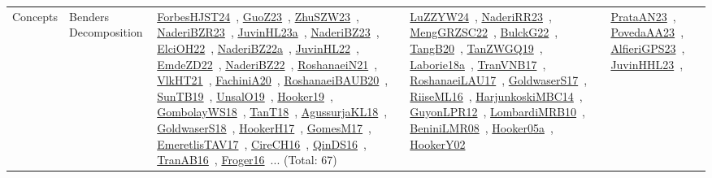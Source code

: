 {\begin{longtable}{lp{3cm}>{\raggedright\arraybackslash}p{6cm}>{\raggedright\arraybackslash}p{6cm}>{\raggedright\arraybackslash}p{8cm}}
\index{Benders Decomposition}\index{Concepts!Benders Decomposition}Concepts & Benders Decomposition & \href{../works/ForbesHJST24.pdf}{ForbesHJST24}~\cite{ForbesHJST24}, \href{../works/GuoZ23.pdf}{GuoZ23}~\cite{GuoZ23}, \href{../works/ZhuSZW23.pdf}{ZhuSZW23}~\cite{ZhuSZW23}, \href{../works/NaderiBZR23.pdf}{NaderiBZR23}~\cite{NaderiBZR23}, \href{../works/JuvinHL23a.pdf}{JuvinHL23a}~\cite{JuvinHL23a}, \href{../works/NaderiBZ23.pdf}{NaderiBZ23}~\cite{NaderiBZ23}, \href{../works/ElciOH22.pdf}{ElciOH22}~\cite{ElciOH22}, \href{../works/NaderiBZ22a.pdf}{NaderiBZ22a}~\cite{NaderiBZ22a}, \href{../works/JuvinHL22.pdf}{JuvinHL22}~\cite{JuvinHL22}, \href{../works/EmdeZD22.pdf}{EmdeZD22}~\cite{EmdeZD22}, \href{../works/NaderiBZ22.pdf}{NaderiBZ22}~\cite{NaderiBZ22}, \href{../works/RoshanaeiN21.pdf}{RoshanaeiN21}~\cite{RoshanaeiN21}, \href{../works/VlkHT21.pdf}{VlkHT21}~\cite{VlkHT21}, \href{../works/FachiniA20.pdf}{FachiniA20}~\cite{FachiniA20}, \href{../works/RoshanaeiBAUB20.pdf}{RoshanaeiBAUB20}~\cite{RoshanaeiBAUB20}, \href{../works/SunTB19.pdf}{SunTB19}~\cite{SunTB19}, \href{../works/UnsalO19.pdf}{UnsalO19}~\cite{UnsalO19}, \href{../works/Hooker19.pdf}{Hooker19}~\cite{Hooker19}, \href{../works/GombolayWS18.pdf}{GombolayWS18}~\cite{GombolayWS18}, \href{../works/TanT18.pdf}{TanT18}~\cite{TanT18}, \href{../works/AgussurjaKL18.pdf}{AgussurjaKL18}~\cite{AgussurjaKL18}, \href{../works/GoldwaserS18.pdf}{GoldwaserS18}~\cite{GoldwaserS18}, \href{../works/HookerH17.pdf}{HookerH17}~\cite{HookerH17}, \href{../works/GomesM17.pdf}{GomesM17}~\cite{GomesM17}, \href{../works/EmeretlisTAV17.pdf}{EmeretlisTAV17}~\cite{EmeretlisTAV17}, \href{../works/CireCH16.pdf}{CireCH16}~\cite{CireCH16}, \href{../works/QinDS16.pdf}{QinDS16}~\cite{QinDS16}, \href{../works/TranAB16.pdf}{TranAB16}~\cite{TranAB16}, \href{../works/Froger16.pdf}{Froger16}~\cite{Froger16}... (Total: 67) & \href{../works/LuZZYW24.pdf}{LuZZYW24}~\cite{LuZZYW24}, \href{../works/NaderiRR23.pdf}{NaderiRR23}~\cite{NaderiRR23}, \href{../works/MengGRZSC22.pdf}{MengGRZSC22}~\cite{MengGRZSC22}, \href{../works/BulckG22.pdf}{BulckG22}~\cite{BulckG22}, \href{../works/TangB20.pdf}{TangB20}~\cite{TangB20}, \href{../works/TanZWGQ19.pdf}{TanZWGQ19}~\cite{TanZWGQ19}, \href{../works/Laborie18a.pdf}{Laborie18a}~\cite{Laborie18a}, \href{../works/TranVNB17.pdf}{TranVNB17}~\cite{TranVNB17}, \href{../works/RoshanaeiLAU17.pdf}{RoshanaeiLAU17}~\cite{RoshanaeiLAU17}, \href{../works/GoldwaserS17.pdf}{GoldwaserS17}~\cite{GoldwaserS17}, \href{../works/RiiseML16.pdf}{RiiseML16}~\cite{RiiseML16}, \href{../works/HarjunkoskiMBC14.pdf}{HarjunkoskiMBC14}~\cite{HarjunkoskiMBC14}, \href{../works/GuyonLPR12.pdf}{GuyonLPR12}~\cite{GuyonLPR12}, \href{../works/LombardiMRB10.pdf}{LombardiMRB10}~\cite{LombardiMRB10}, \href{../works/BeniniLMR08.pdf}{BeniniLMR08}~\cite{BeniniLMR08}, \href{../works/Hooker05a.pdf}{Hooker05a}~\cite{Hooker05a}, \href{../works/HookerY02.pdf}{HookerY02}~\cite{HookerY02} & \href{../works/PrataAN23.pdf}{PrataAN23}~\cite{PrataAN23}, \href{../works/PovedaAA23.pdf}{PovedaAA23}~\cite{PovedaAA23}, \href{../works/AlfieriGPS23.pdf}{AlfieriGPS23}~\cite{AlfieriGPS23}, \href{../works/JuvinHHL23.pdf}{JuvinHHL23}~\cite{JuvinHHL23}, 
\end{longtable}}
